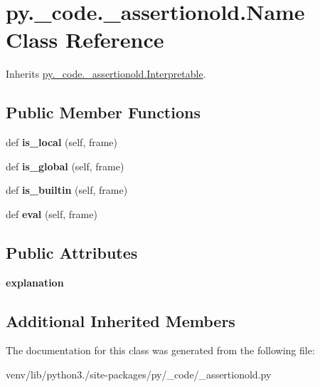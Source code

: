 \hypertarget{classpy_1_1__code_1_1__assertionold_1_1_name}{}\section{py.\+\_\+code.\+\_\+assertionold.\+Name Class Reference}
\label{classpy_1_1__code_1_1__assertionold_1_1_name}


Inherits \hyperlink{classpy_1_1__code_1_1__assertionold_1_1_interpretable}{py.\+\_\+code.\+\_\+assertionold.\+Interpretable}.

\subsection*{Public Member Functions}
\begin{DoxyCompactItemize}
\item 
\mbox{\label{classpy_1_1__code_1_1__assertionold_1_1_name_a9db6f0e2ec413ee3e2a858d017e8cff9}} 
def {\bfseries is\+\_\+local} (self, frame)
\item 
\mbox{\label{classpy_1_1__code_1_1__assertionold_1_1_name_a0705fd4f542fbd9e6512e877688c9df9}} 
def {\bfseries is\+\_\+global} (self, frame)
\item 
\mbox{\label{classpy_1_1__code_1_1__assertionold_1_1_name_a918566b4c78ad85222974c49996a3017}} 
def {\bfseries is\+\_\+builtin} (self, frame)
\item 
\mbox{\label{classpy_1_1__code_1_1__assertionold_1_1_name_abb86eb8bc44220b119033e62e0288c70}} 
def {\bfseries eval} (self, frame)
\end{DoxyCompactItemize}
\subsection*{Public Attributes}
\begin{DoxyCompactItemize}
\item 
\mbox{\label{classpy_1_1__code_1_1__assertionold_1_1_name_abaa7e2944263617ffd57af993641503e}} 
{\bfseries explanation}
\end{DoxyCompactItemize}
\subsection*{Additional Inherited Members}


The documentation for this class was generated from the following file\+:\begin{DoxyCompactItemize}
\item 
venv/lib/python3./site-\/packages/py/\+\_\+code/\+\_\+assertionold.\+py\end{DoxyCompactItemize}
